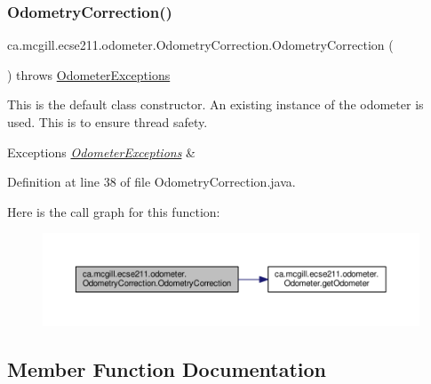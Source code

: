 \subsubsection{\texorpdfstring{Odometry\+Correction()}{OdometryCorrection()}}
{\footnotesize\ttfamily ca.\+mcgill.\+ecse211.\+odometer.\+Odometry\+Correction.\+Odometry\+Correction (\begin{DoxyParamCaption}{ }\end{DoxyParamCaption}) throws \hyperlink{classca_1_1mcgill_1_1ecse211_1_1odometer_1_1_odometer_exceptions}{Odometer\+Exceptions}}

This is the default class constructor. An existing instance of the odometer is used. This is to ensure thread safety.


\begin{DoxyExceptions}{Exceptions}
{\em \hyperlink{classca_1_1mcgill_1_1ecse211_1_1odometer_1_1_odometer_exceptions}{Odometer\+Exceptions}} & \\
\hline
\end{DoxyExceptions}


Definition at line 38 of file Odometry\+Correction.\+java.

Here is the call graph for this function\+:
\nopagebreak
\begin{figure}[H]
\begin{center}
\leavevmode
\includegraphics[width=350pt]{classca_1_1mcgill_1_1ecse211_1_1odometer_1_1_odometry_correction_ad80b45e0bc4bf935494e075edcec739c_cgraph}
\end{center}
\end{figure}


\subsection{Member Function Documentation}
\mbox{\label{classca_1_1mcgill_1_1ecse211_1_1odometer_1_1_odometry_correction_a21a351682dc75060d6a5f15ad4775068}} 
